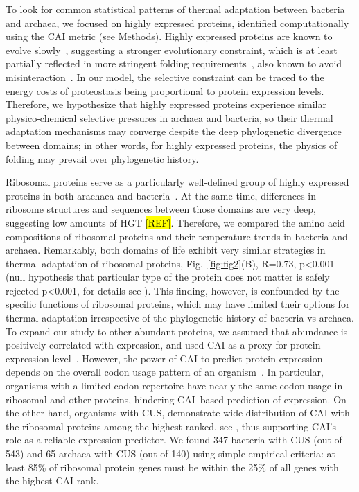 \documentclass[10pt,letterpaper]{article}
\begin{document}
To look for common statistical patterns of thermal adaptation between bacteria and archaea, we focused on highly expressed proteins, identified computationally using the CAI metric (see Methods). Highly expressed proteins are known to evolve slowly~\cite{Pal2001Highly,Rocha2004An}, suggesting a stronger evolutionary constraint, which is at least partially reflected in more stringent folding requirements~\cite{Serohijos2012Protein,Drummond2005Why,Drummond2008MistranslationInduced}, also known to avoid misinteraction~\cite{Yang2012Protein}. In our model, the selective constraint can be traced to the energy costs of proteostasis being proportional to protein expression levels. Therefore, we hypothesize that highly expressed proteins experience similar physico-chemical selective pressures in archaea and bacteria, so their thermal adaptation mechanisms may converge despite the deep phylogenetic divergence between domains; in other words, for highly expressed proteins, the physics of folding may prevail over phylogenetic history.

Ribosomal proteins serve as a particularly well-defined group of highly expressed proteins in both arachaea and bacteria~\cite{Karlin2005Predicted}. At the same time, differences in ribosome structures and sequences between those domains are very deep, suggesting low amounts of HGT \hl{[REF]}. Therefore, we compared the amino acid compositions  of ribosomal proteins and their temperature trends in bacteria and archaea. Remarkably, both domains of life exhibit very similar strategies in thermal adaptation of ribosomal proteins, Fig.~\ref{fig:fig2}(B), R=0.73, p\textless 0.001 (null hypothesis that particular type of the protein does not matter is safely rejected p\textless0.001, for details see ). This finding, however, is confounded by the specific functions of ribosomal proteins, which may have limited their options for thermal adaptation irrespective of the phylogenetic history of bacteria vs archaea. To expand our study to other abundant proteins, we assumed that abundance is positively correlated with expression, and used CAI as a proxy for protein expression level~\cite{Jansen2003Revisiting}. However, the power of CAI to predict protein expression depends on the overall codon usage pattern of an organism~\cite{Botzman2011Variation}. In particular, organisms with a limited codon repertoire have nearly the same codon usage in ribosomal and other proteins, hindering CAI--based prediction of expression. On the other hand, organisms with CUS, demonstrate wide distribution of CAI with the ribosomal proteins among the highest ranked, see , thus supporting CAI's role as a reliable expression predictor. We found 347 bacteria with CUS (out of 543) and 65 archaea with CUS (out of 140) using simple empirical criteria: at least 85\% of ribosomal protein genes must be within the 25\% of all genes with the highest CAI rank.
\end{document}

